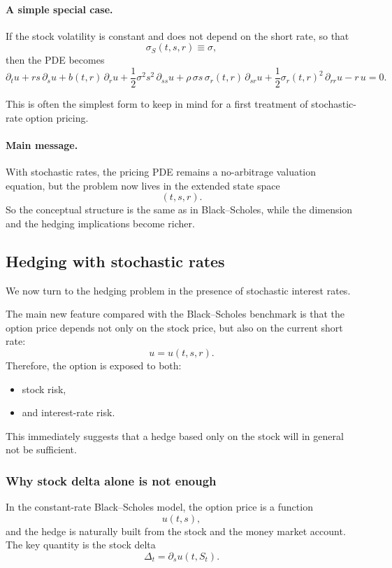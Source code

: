 \documentclass[11pt]{article}
\theoremstyle{plain}
\theoremstyle{definition}
\theoremstyle{remark}
\begin{document}
\paragraph{A simple special case.}
If the stock volatility is constant and does not depend on the short
rate, so that
\[
\sigma_S(t,s,r)\equiv \sigma,
\]
then the PDE becomes
\[
\boxed{
\partial_t u
+
rs\,\partial_s u
+
b(t,r)\,\partial_r u
+
\frac12 \sigma^2 s^2\,\partial_{ss}u
+
\rho\,\sigma s\,\sigma_r(t,r)\,\partial_{sr}u
+
\frac12 \sigma_r(t,r)^2\,\partial_{rr}u
-r\,u
=
0.
}
\]

This is often the simplest form to keep in mind for a first treatment of
stochastic-rate option pricing.

\paragraph{Main message.}
With stochastic rates, the pricing PDE remains a no-arbitrage valuation
equation, but the problem now lives in the extended state space
\[
(t,s,r).
\]
So the conceptual structure is the same as in Black--Scholes, while the
dimension and the hedging implications become richer.

\subsection{Hedging with stochastic rates}

We now turn to the hedging problem in the presence of stochastic
interest rates.

The main new feature compared with the Black--Scholes benchmark is that
the option price depends not only on the stock price, but also on the
current short rate:
\[
u=u(t,s,r).
\]
Therefore, the option is exposed to both:
\begin{itemize}[leftmargin=1.4em]
    \item stock risk,
    \item and interest-rate risk.
\end{itemize}

This immediately suggests that a hedge based only on the stock will in
general not be sufficient.

\subsubsection{Why stock delta alone is not enough}

In the constant-rate Black--Scholes model, the option price is a
function
\[
u(t,s),
\]
and the hedge is naturally built from the stock and the money market
account.
The key quantity is the stock delta
\[
\Delta_t=\partial_s u(t,S_t).
\]
\end{document}
